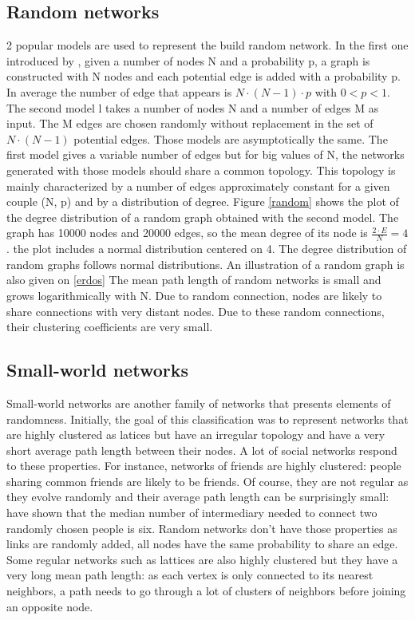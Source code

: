 \documentclass[a4paper, 12pt]{report}
\begin{document}
\subsection{Random networks}
\label{random-section}
2 popular models are used to represent the build random network. In the first one introduced by \cite{erdosRandom}, given a number of nodes N and a probability p, a graph is constructed with N nodes and each potential edge is added with a probability p. In average the number of edge that appears is $N \cdot (N-1) \cdot p$ with $ 0< p <1$. The second model \citep{gilbertRandom} l takes a number of nodes N and a number of edges M as input. The M edges are chosen randomly without replacement in the set of $N \cdot (N-1)$ potential edges. Those models are asymptotically the same. The first model gives a variable number of edges but for big values of N, the networks generated with those models should share a common topology. This topology is mainly characterized by a number of edges approximately constant for a given couple (N, p) and by a distribution of degree. Figure \ref{random} shows the plot of the degree distribution of a random graph obtained with the second model. The graph has 10000 nodes and 20000 edges, so the mean degree of its node is $\frac{2 \cdot E}{N} = 4$. the plot includes a normal distribution centered on 4. The degree distribution of random graphs follows normal distributions. An illustration of a random graph is also given on \ref{erdos} The mean path length of random networks is small and grows logarithmically with N. Due to random connection, nodes are likely to share connections with very distant nodes. Due to these random connections, their clustering coefficients are very small.\\

\subsection{Small-world networks}
\label{sm-section}
Small-world networks are another family of networks that presents elements of randomness. Initially, the goal of this classification was to represent networks that are highly clustered as latices but have an irregular topology and have a very short average path length between their nodes. A lot of social networks respond to these properties. For instance, networks of friends are highly clustered: people sharing common friends are likely to be friends. Of course, they are not regular as they evolve randomly and their average path length can be surprisingly small: \cite{milgram} have shown that the median number of intermediary needed to connect two randomly chosen people is six. Random networks don't have those properties as links are randomly added, all nodes have the same probability to share an edge. Some regular networks such as lattices are also highly clustered but they have a very long mean path length: as each vertex is only connected to its nearest neighbors, a path needs to go through a lot of clusters of neighbors before joining an opposite node. \citep{complex_networks} \\
\end{document}
